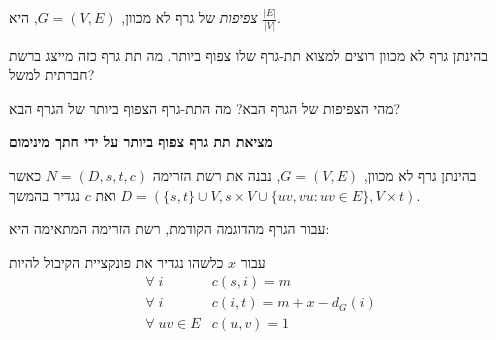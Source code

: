 \begin{definition}[צפיפות]
\emph{צפיפות}
של גרף לא מכוון, 
$G = (V, E)$, 
היא 
$\frac{|E|}{|V|}$.
\end{definition}
בהינתן גרף לא מכוון רוצים למצוא תת-גרף שלו צפוף ביותר. מה תת גרף כזה מייצג ברשת חברתית למשל?

\begin{example}
מהי הצפיפות של הגרף הבא? מה התת-גרף הצפוף ביותר של הגרף הבא?
\end{example}

\begin{center}
\end{center}

\textbf{מציאת תת גרף צפוף ביותר על ידי חתך מינימום}

בהינתן גרף לא מכוון, 
$G = (V, E)$, 
נבנה את רשת הזרימה 
$N = (D, s, t, c)$
כאשר 
$D = (\{s,t\} \cup V, s \times V \cup \{uv, vu : uv \in E\}, V \times t)$ 
ואת $c$ נגדיר בהמשך.

\begin{example}
עבור הגרף מהדוגמה הקודמת, רשת הזרימה המתאימה היא:
\end{example}

\begin{center}
\end{center}


עבור $x$ כלשהו נגדיר את פונקציית הקיבול להיות
$$
\begin{array}{ll}
\forall \; i 		& c(s, i) = m
\\
\forall \; i		& c(i, t) = m + x - d_G(i)
\\
\forall \; uv \in E	& c(u, v) = 1
\end{array}
$$

